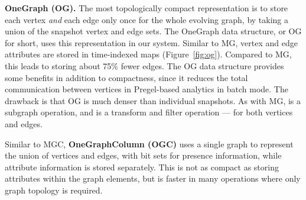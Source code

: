 {\bf OneGraph (OG).}  The most topologically compact representation is
to store each vertex {\em and} each edge only once for the whole
evolving graph, by taking a union of the snapshot vertex and edge
sets.  The OneGraph data structure, or OG for short, uses this
representation in our system.  Similar to MG, vertex and edge
attributes are stored in time-indexed maps (Figure~\ref{fig:og}).
Compared to MG, this leads to storing about 75\% fewer edges.  The OG
data structure provides some benefits in addition to compactness,
since it reduces the total communication between vertices in
Pregel-based analytics in batch mode.  The drawback is that OG is much
denser than individual snapshots.  As with MG,  is a
subgraph operation, and  is a transform and filter
operation --- for both vertices and edges.

Similar to MGC, {\bf OneGraphColumn (OGC)} uses a single graph to
represent the union of vertices and edges, with bit sets for presence
information, while attribute information is stored separately.  This
is not as compact as storing attributes within the graph elements, but
is faster in many operations where only graph topology is required.

